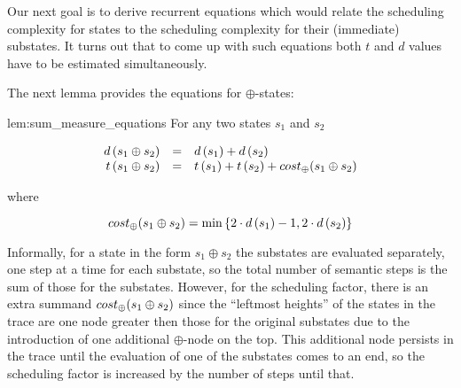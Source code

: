 Our next goal is to derive recurrent equations which would relate the scheduling complexity for states to the scheduling complexity for their
(immediate) substates. It turns out that to come up with such equations both $t$ and $d$ values have to be estimated simultaneously.  




The next lemma provides the equations for $\oplus$-states:

\begin{replemma}{lem:sum_measure_equations}
For any two states $s_1$ and $s_2$

\[
\begin{array}{rcl}
  d\,(s_1 \oplus s_2) &=& d\,(s_1) + d\,(s_2) \\
    t\,(s_1 \oplus s_2) &=& t\,(s_1) + t\,(s_2) + cost_{\oplus}(s_1 \oplus s_2)
\end{array}
\]

where

\[ cost_{\oplus}(s_1 \oplus s_2) = \min\,\{2\cdot d\,(s_1) - 1, 2\cdot d\,(s_2)\} \] 
\end{replemma}

Informally, for a state in the form $s_1 \oplus s_2$ the substates are evaluated separately, one step at a time for
each substate, so the total number of semantic steps is the sum of those for the substates. However, for the scheduling factor, 
there is an extra summand $cost_{\oplus}(s_1 \oplus s_2)$ since the ``leftmost heights'' of the states in the trace are one node greater then those for the
original substates due to the introduction of one additional $\oplus$-node on the top. This additional node persists in the trace until the evaluation
of one of the substates comes to an end, so the scheduling factor is increased by the number of steps until that.


